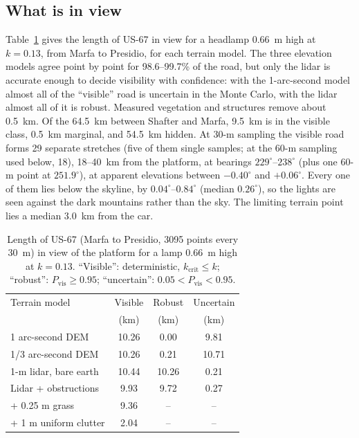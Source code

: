 \documentclass[aip,jap,amsmath,amssymb,reprint,floatfix]{revtex4-2}
\newcommand{\kc}{k_{\mathrm{crit}}}
\begin{document}
\subsection{What is in view}\label{sec:inview}

Table~\ref{tab:config} gives the length of US-67 in view for a headlamp 0.66~m high at $k=0.13$, from Marfa to Presidio, for each terrain model. The three elevation models agree point by point for 98.6--99.7\% of the road, but only the lidar is accurate enough to decide visibility with confidence: with the 1-arc-second model almost all of the ``visible'' road is uncertain in the Monte Carlo, with the lidar almost all of it is robust. Measured vegetation and structures remove about 0.5~km. Of the 64.5~km between Shafter and Marfa, 9.5~km is in the visible class, 0.5~km marginal, and 54.5~km hidden. At 30-m sampling the visible road forms 29 separate stretches (five of them single samples; at the 60-m sampling used below, 18), 18--40~km from the platform, at bearings $229^\circ$--$238^\circ$ (plus one 60-m point at $251.9^\circ$), at apparent elevations between $-0.40^\circ$ and $+0.06^\circ$. Every one of them lies below the skyline, by $0.04^\circ$--$0.84^\circ$ (median $0.26^\circ$), so the lights are seen against the dark mountains rather than the sky. The limiting terrain point lies a median 3.0~km from the car.

\begin{table}[t]
\caption{Length of US-67 (Marfa to Presidio, 3095 points every 30~m) in view of the platform for a lamp 0.66~m high at $k=0.13$. ``Visible'': deterministic, $\kc\le k$; ``robust'': $P_{\mathrm{vis}}\ge0.95$; ``uncertain'': $0.05<P_{\mathrm{vis}}<0.95$.}
\label{tab:config}
\begin{ruledtabular}
\begin{tabular}{lccc}
Terrain model & Visible & Robust & Uncertain \\
 & (km) & (km) & (km)\\
\hline
1 arc-second DEM & 10.26 & 0.00 & 9.81\\
1/3 arc-second DEM & 10.26 & 0.21 & 10.71\\
1-m lidar, bare earth & 10.44 & 10.26 & 0.21\\
Lidar + obstructions & 9.93 & 9.72 & 0.27\\
\quad + 0.25 m grass & 9.36 & -- & --\\
\quad + 1 m uniform clutter & 2.04 & -- & --\\
\end{tabular}
\end{ruledtabular}
\end{table}
\end{document}
